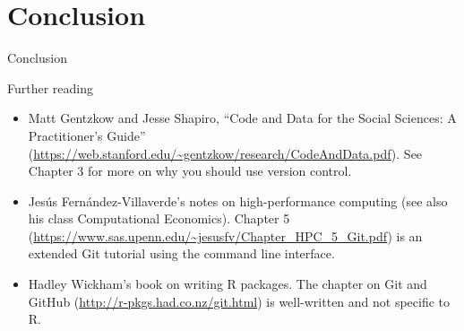 \documentclass{beamer}
\begin{document}
\section*{Conclusion}

\begin{frame}{Conclusion}
\end{frame}

\begin{frame}{Further reading}
\begin{itemize}
\item Matt Gentzkow and Jesse Shapiro, ``Code and Data for the Social Sciences: A Practitioner’s Guide'' (\url{https://web.stanford.edu/~gentzkow/research/CodeAndData.pdf}). See Chapter 3 for more on why you should use version control.
\item Jes\'us Fern\'andez-Villaverde's notes on high-performance computing (see also his class Computational Economics). Chapter 5 (\url{https://www.sas.upenn.edu/~jesusfv/Chapter_HPC_5_Git.pdf}) is an extended Git tutorial using the command line interface.
\item Hadley Wickham's book on writing R packages. The chapter on Git and GitHub (\url{http://r-pkgs.had.co.nz/git.html}) is well-written and not specific to R.
\end{itemize}
\end{frame}
\end{document}
